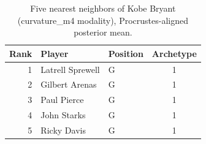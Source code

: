 \begin{table}[htbp]
  \centering\small
  \begin{tabular}{rllc}
    \toprule
    Rank & Player & Position & Archetype \\
    \midrule
    1 & Latrell Sprewell & G & 1 \\
    2 & Gilbert Arenas & G & 1 \\
    3 & Paul Pierce & G & 1 \\
    4 & John Starks & G & 1 \\
    5 & Ricky Davis & G & 1 \\
    \bottomrule
  \end{tabular}
  \caption{Five nearest neighbors of Kobe Bryant (curvature_m4 modality), Procrustes-aligned posterior mean.}
  \label{tab:Kobe_Bryant_neighbors_curvature_m4}
\end{table}

